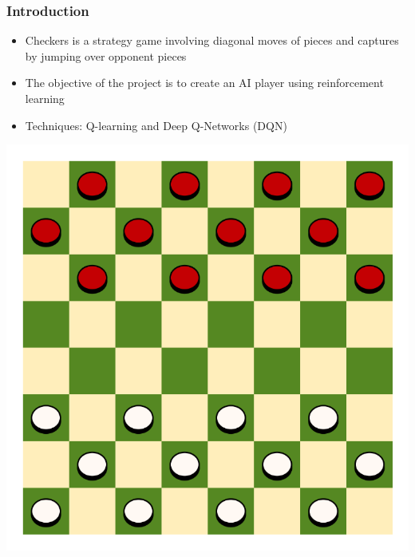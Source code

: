 \begin{frame}
	\frametitle{Introduction}
	\vspace{0.5cm}
	\begin{itemize}
		\item Checkers is a strategy game involving diagonal moves of pieces and captures by jumping over opponent pieces
		\item The objective of the project is to create an AI player using reinforcement learning
		\item Techniques: Q-learning and Deep Q-Networks (DQN)
	\end{itemize}
	\centering
	\includegraphics[scale=0.25]{checkers}
\end{frame}


